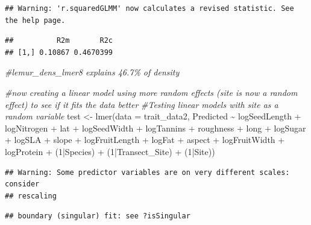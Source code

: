 \documentclass[
  12pt,
]{article}
\newenvironment{Shaded}{\begin{snugshade}}{\end{snugshade}}
\newcommand{\AttributeTok}[1]{\textcolor[rgb]{0.77,0.63,0.00}{#1}}
\newcommand{\CommentTok}[1]{\textcolor[rgb]{0.56,0.35,0.01}{\textit{#1}}}
\newcommand{\DecValTok}[1]{\textcolor[rgb]{0.00,0.00,0.81}{#1}}
\newcommand{\FunctionTok}[1]{\textcolor[rgb]{0.00,0.00,0.00}{#1}}
\newcommand{\NormalTok}[1]{#1}
\newcommand{\OtherTok}[1]{\textcolor[rgb]{0.56,0.35,0.01}{#1}}
\newcommand{\SpecialCharTok}[1]{\textcolor[rgb]{0.00,0.00,0.00}{#1}}
\begin{document}
\begin{verbatim}
## Warning: 'r.squaredGLMM' now calculates a revised statistic. See the help page.
\end{verbatim}

\begin{verbatim}
##          R2m       R2c
## [1,] 0.10867 0.4670399
\end{verbatim}

\begin{Shaded}
\begin{Highlighting}[]
\CommentTok{\#lemur\_dens\_lmer8 explains 46.7\% of density}
\end{Highlighting}
\end{Shaded}

\begin{Shaded}
\begin{Highlighting}[]
\CommentTok{\#now creating a linear model using more random effects (site is now a random effect) to see if it fits the data better}
\CommentTok{\#Testing linear models with site as a random variable}
\NormalTok{test }\OtherTok{\textless{}{-}} \FunctionTok{lmer}\NormalTok{(}\AttributeTok{data =}\NormalTok{ trait\_data2, Predicted }\SpecialCharTok{\textasciitilde{}}\NormalTok{ logSeedLength }\SpecialCharTok{+}\NormalTok{ logNitrogen }\SpecialCharTok{+}\NormalTok{ lat }\SpecialCharTok{+}\NormalTok{ logSeedWidth }\SpecialCharTok{+}\NormalTok{ logTannins }\SpecialCharTok{+}\NormalTok{ roughness }\SpecialCharTok{+}\NormalTok{ long }\SpecialCharTok{+}\NormalTok{ logSugar }\SpecialCharTok{+}\NormalTok{ logSLA }\SpecialCharTok{+}\NormalTok{ slope }\SpecialCharTok{+}\NormalTok{ logFruitLength }\SpecialCharTok{+}\NormalTok{ logFat }\SpecialCharTok{+}\NormalTok{ aspect }\SpecialCharTok{+}\NormalTok{ logFruitWidth }\SpecialCharTok{+}\NormalTok{ logProtein }\SpecialCharTok{+}\NormalTok{ (}\DecValTok{1}\SpecialCharTok{|}\NormalTok{Species) }\SpecialCharTok{+}\NormalTok{ (}\DecValTok{1}\SpecialCharTok{|}\NormalTok{Transect\_Site) }\SpecialCharTok{+}\NormalTok{ (}\DecValTok{1}\SpecialCharTok{|}\NormalTok{Site))}
\end{Highlighting}
\end{Shaded}

\begin{verbatim}
## Warning: Some predictor variables are on very different scales: consider
## rescaling
\end{verbatim}

\begin{verbatim}
## boundary (singular) fit: see ?isSingular
\end{verbatim}
\end{document}
